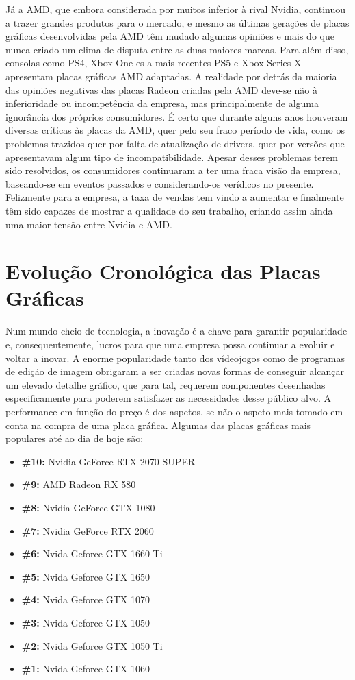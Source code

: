 \documentclass{report}
\begin{document}
\vspace{5mm} Já a AMD, que embora considerada por muitos inferior à rival Nvidia, continuou a trazer grandes produtos para o mercado, e mesmo as últimas gerações de placas gráficas desenvolvidas pela AMD têm mudado algumas opiniões e mais do que nunca criado um clima de disputa entre as duas maiores marcas. Para além disso, consolas como PS4, Xbox One es a mais recentes PS5 e Xbox Series X apresentam placas gráficas AMD adaptadas. A realidade por detrás da maioria das opiniões negativas das placas Radeon criadas pela AMD deve-se não à inferioridade ou incompetência da empresa, mas principalmente de alguma ignorância dos próprios consumidores. É certo que durante alguns anos houveram diversas críticas às placas da AMD, quer pelo seu fraco período de vida, como os problemas trazidos quer por falta de atualização de drivers, quer por versões que apresentavam algum tipo de incompatibilidade. Apesar desses problemas terem sido resolvidos, os consumidores continuaram a ter uma fraca visão da empresa, baseando-se em eventos passados e considerando-os verídicos no presente. Felizmente para a empresa, a taxa de vendas tem vindo a aumentar e finalmente têm sido capazes de mostrar a qualidade do seu trabalho, criando assim ainda uma maior tensão entre Nvidia e AMD.

\section{Evolução Cronológica das Placas Gráficas}
Num mundo cheio de tecnologia, a inovação é a chave para garantir popularidade e, consequentemente, lucros para que uma empresa possa continuar a evoluir e voltar a inovar. A enorme popularidade tanto dos  vídeojogos como de programas de edição de imagem obrigaram a ser criadas novas formas de conseguir alcançar um elevado detalhe gráfico, que para tal, requerem componentes desenhadas especificamente para poderem satisfazer as necessidades desse público alvo. A performance em função do preço é dos aspetos, se não o aspeto mais tomado em conta na compra de uma placa gráfica. Algumas das placas gráficas mais populares até ao dia de hoje são:
\begin{itemize}
    \item \textbf{\#10:} Nvidia GeForce RTX 2070 SUPER
    \item \textbf{\#9:} AMD Radeon RX 580
    \item \textbf{\#8:} Nvidia GeForce GTX 1080
    \item \textbf{\#7:} Nvidia GeForce RTX 2060
    \item \textbf{\#6:} Nvida Geforce GTX 1660 Ti
    \item \textbf{\#5:} Nvida Geforce GTX 1650
    \item \textbf{\#4:} Nvida Geforce GTX 1070
    \item \textbf{\#3:} Nvida Geforce GTX 1050
    \item \textbf{\#2:} Nvida Geforce GTX 1050 Ti
    \item \textbf{\#1:} Nvida Geforce GTX 1060
\end{itemize}
\end{document}
